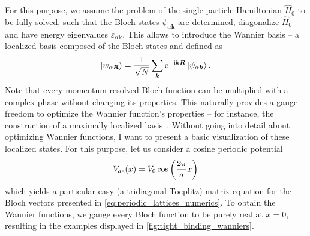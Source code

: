 For this purpose, we assume the problem of the single-particle Hamiltonian $\hat H_0$ to be fully solved, such that the Bloch states $\psi_{\alpha{\bm k}}$ are determined, diagonalize $\hat H_0$ and have energy eigenvalues $\varepsilon_{\alpha{\bm k}}$.
This allows to introduce the Wannier basis -- a localized basis composed of the Bloch states and defined as
\begin{align}
    \ket{w_{\alpha{\bm R}}} = \frac1{\sqrt N}\sum_{\bm k}\mathrm e^{-\mathrm i{\bm k}{\bm R}}\ket{\psi_{\alpha{\bm k}}}.
    \label{eq:wannier_states}
\end{align}
Note that every momentum-resolved Bloch function can be multiplied with a complex phase without changing its properties.
This naturally provides a gauge freedom to optimize the Wannier function's properties -- for instance, the construction of a maximally localized basis~\cite{Marzari2012}.
Without going into detail about optimizing Wannier functions, I want to present a basic visualization of these localized states.
For this purpose, let us consider a cosine periodic potential
\begin{align}
    V_{ae}(x) = V_0\cos\left( \frac{2\pi}a x \right)
\end{align}
which yields a particular easy (a tridiagonal Toeplitz) matrix equation for the Bloch vectors presented in \cref{eq:periodic_lattices_numerics}.
To obtain the Wannier functions, we gauge every Bloch function to be purely real at $x=0$, resulting in the examples displayed in \cref{fig:tight_binding_wanniers}.

